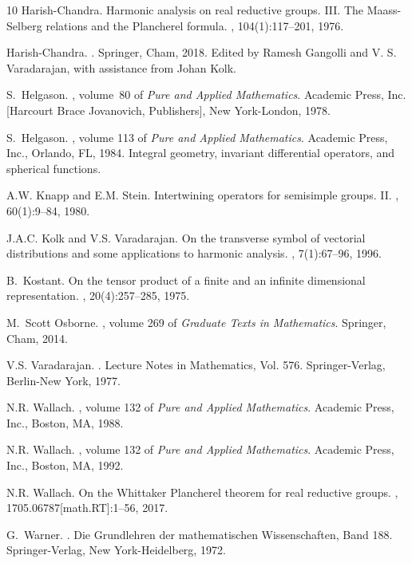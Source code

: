 \documentclass[12pt,a4paper]{article}
\numberwithin{Thm}{section}
\numberwithin{equation}{section}
\numberwithin{equation}{section}
\begin{document}
\begin{thebibliography}{10}
Harish-Chandra.
\newblock Harmonic analysis on real reductive groups. {III}. {T}he
  {M}aass-{S}elberg relations and the {P}lancherel formula.
, 104(1):117--201, 1976.

Harish-Chandra.
.
\newblock Springer, Cham, 2018.
\newblock Edited by Ramesh Gangolli and V. S. Varadarajan, with assistance from
  Johan Kolk.

S.~Helgason.
,
  volume~80 of {\em Pure and Applied Mathematics}.
\newblock Academic Press, Inc. [Harcourt Brace Jovanovich, Publishers], New
  York-London, 1978.

S.~Helgason.
, volume 113 of {\em Pure and
  Applied Mathematics}.
\newblock Academic Press, Inc., Orlando, FL, 1984.
\newblock Integral geometry, invariant differential operators, and spherical
  functions.

A.W. Knapp and E.M. Stein.
\newblock Intertwining operators for semisimple groups. {II}.
, 60(1):9--84, 1980.

J.A.C. Kolk and V.S. Varadarajan.
\newblock On the transverse symbol of vectorial distributions and some
  applications to harmonic analysis.
, 7(1):67--96, 1996.

B.~Kostant.
\newblock On the tensor product of a finite and an infinite dimensional
  representation.
, 20(4):257--285, 1975.

M.~Scott Osborne.
, volume 269 of {\em Graduate Texts in
  Mathematics}.
\newblock Springer, Cham, 2014.

V.S. Varadarajan.
.
\newblock Lecture Notes in Mathematics, Vol. 576. Springer-Verlag, Berlin-New
  York, 1977.

N.R. Wallach.
, volume 132 of {\em Pure and Applied
  Mathematics}.
\newblock Academic Press, Inc., Boston, MA, 1988.

N.R. Wallach.
, volume 132 of {\em Pure and
  Applied Mathematics}.
\newblock Academic Press, Inc., Boston, MA, 1992.

N.R. Wallach.
\newblock On the {W}hittaker {P}lancherel theorem for real reductive groups.
, 1705.06787[math.RT]:1--56, 2017.

G.~Warner.
.
\newblock Die Grundlehren der mathematischen Wissenschaften, Band 188.
  Springer-Verlag, New York-Heidelberg, 1972.

\end{thebibliography}
\end{document}
